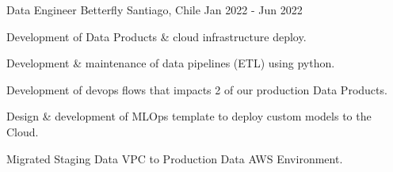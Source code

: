   \newline
  \cventry
  {Data Engineer} %
  {Betterfly} %
  {Santiago, Chile} %
  {Jan 2022 - Jun 2022} %
  {
    \begin{cvitems} %
      \item {Development of Data Products \& cloud infrastructure deploy.}
      \item {Development \& maintenance of data pipelines (ETL) using python.}
      \item {Development of devops flows that impacts 2 of our production Data Products.}
      \item {Design \& development of MLOps template to deploy custom models to the Cloud.}
      \item {Migrated Staging Data VPC to Production Data AWS Environment.}
    \end{cvitems}
  }
  \newline
